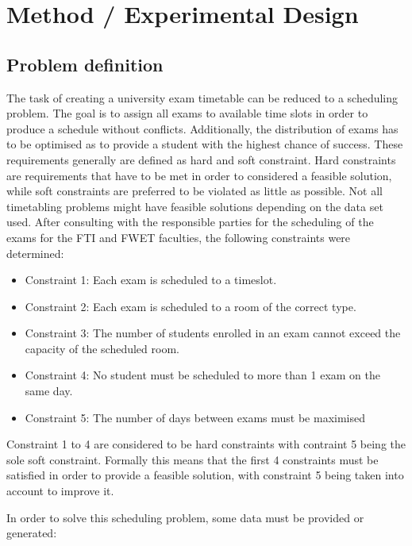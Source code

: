 
\section{Method / Experimental Design}\label{sec:method}

 \subsection{Problem definition}

The task of creating a university exam timetable can be reduced to a scheduling problem. The goal is to assign all exams to available time slots in order to produce a schedule without conflicts. Additionally, the distribution of exams has to be optimised as to provide a student with the highest chance of success. These requirements generally are defined as hard and soft constraint. Hard constraints are requirements that have to be met in order to considered a feasible solution, while soft constraints are preferred to be violated as little as possible. Not all timetabling problems might have feasible solutions depending on the data set used. After consulting with the responsible parties for the scheduling of the exams for the FTI and FWET faculties, the following constraints were determined:
\begin{itemize}
    \item Constraint 1: Each exam is scheduled to a timeslot.
    \item Constraint 2: Each exam is scheduled to a room of the correct type.
    \item Constraint 3: The number of students enrolled in an exam cannot exceed the capacity of the scheduled room.
    \item Constraint 4: No student must be scheduled to more than 1 exam on the same day.
    \item Constraint 5: The number of days between exams must be maximised
\end{itemize}
Constraint 1 to 4 are considered to be hard constraints with contraint 5 being the sole soft constraint. Formally this means that the first 4 constraints must be satisfied in order to provide a feasible solution, with constraint 5 being taken into account to improve it.

In order to solve this scheduling problem, some data must be provided or generated:

